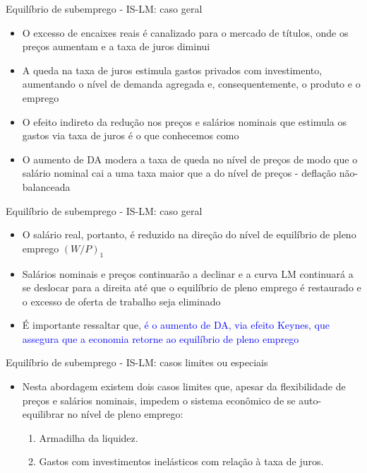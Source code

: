 \documentclass[10pt]{beamer}
\begin{document}
\begin{frame}{Equilíbrio de subemprego - IS-LM: caso geral}
    \begin{itemize}
        \item O excesso de encaixes reais é canalizado para o mercado de títulos, onde os preços aumentam e a taxa de juros diminui
        \bigskip
        \item A queda na taxa de juros estimula gastos privados com investimento, aumentando o nível de demanda agregada e, consequentemente, o produto e o emprego
        \bigskip
        \item O efeito indireto da redução nos preços e salários nominais que estimula os gastos via taxa de juros é o que conhecemos como 
        \bigskip
        \item O aumento de DA modera a taxa de queda no nível de preços de modo que o salário nominal cai a uma taxa maior que a do nível de preços - deflação não-balanceada
    \end{itemize}
\end{frame}

\begin{frame}{Equilíbrio de subemprego - IS-LM: caso geral}
    \begin{itemize}
        \item O salário real, portanto, é reduzido na direção do nível de equilíbrio de pleno emprego $(W/P)_1$
        \bigskip
        \item Salários nominais e preços continuarão a declinar e a curva LM continuará a se deslocar para a direita até que o equilíbrio de pleno emprego é restaurado e o excesso de oferta de trabalho seja eliminado
        \bigskip
        \item É importante ressaltar que, \textcolor{blue}{é o aumento de DA, via efeito Keynes, que assegura que a economia retorne ao equilíbrio de pleno emprego}
    \end{itemize}
\end{frame}

\begin{frame}{Equilíbrio de subemprego - IS-LM: casos limites ou especiais}
    \begin{itemize}
        \item Nesta abordagem existem dois casos limites que, apesar da flexibilidade de preços e salários nominais, impedem o sistema econômico de se auto-equilibrar no nível de pleno emprego:
        \bigskip
        \begin{enumerate}
            \item Armadilha da liquidez.
            \bigskip
            \item Gastos com investimentos inelásticos com relação à taxa de juros.
        \end{enumerate}
    \end{itemize}
\end{frame}
\end{document}
